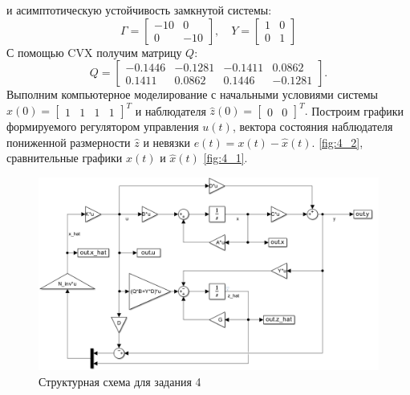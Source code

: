 и асимптотическую устойчивость замкнутой системы:
\begin{equation*}
    \Gamma=\begin{bmatrix}
        -10 &  0 \\
         0 & -10
    \end{bmatrix},\quad
    Y=\begin{bmatrix}
        1& 0\\ 
        0& 1
    \end{bmatrix}
\end{equation*}
С помощью CVX получим матрицу $Q$:
\begin{equation*}
    Q=\begin{bmatrix}
        -0.1446&	-0.1281&	-0.1411&	0.0862\\
        0.1411&	0.0862&	0.1446&	-0.1281
    \end{bmatrix}.
\end{equation*}
Выполним компьютерное моделирование с начальными условиями системы
$
x(0)=\begin{bmatrix}
    1&1&1&1
\end{bmatrix}^T
$
и наблюдателя
$\hat z(0)=\begin{bmatrix}
    0&0
\end{bmatrix}^T.$ Построим графики формируемого регулятором 
управления $u(t)$, вектора состояния наблюдателя пониженной 
размерности $\hat z$ и невязки $e(t) = x(t) - \hat x(t).$ \autoref{fig:4_2}, 
сравнительные графики $x(t)$ и $\hat x(t)$ \autoref{fig:4_1}.

\begin{figure}[H]
    \centering
    \includegraphics[width=\linewidth]{figs/task4_slx.png}
    \caption{Структурная схема для задания 4}
    \label{fig:4}
\end{figure}

